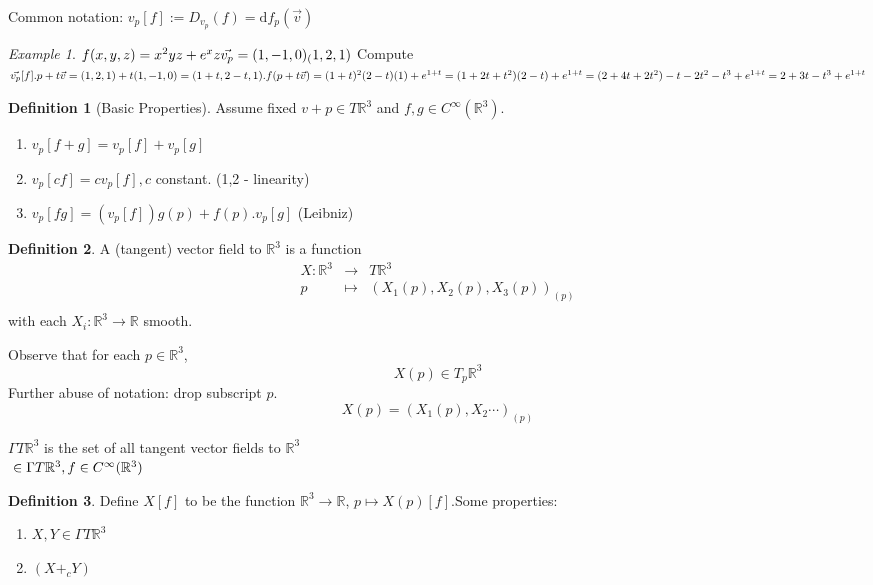 \documentclass{article}
\let\ddd\cdots
\renewcommand{\d}{\mathrm{d}}
\newcommand{\R}{\mathbb{R}}
\theoremstyle{definition}
\newtheorem{definition}{Definition}[section]
\theoremstyle{remark}
\theoremstyle{example}
\newtheorem*{example}{Example}
\begin{document}
	Common notation: $v_p[f]:=D_{v_p}(f)=\d f_p(\vec{v})$
	\begin{example}
		$f(x,y,z) = x^2yz+e^xz\\
		\vec{v_p}=(1,-1,0)_(1,2,1)\\
		$ Compute $\vec{v_p}[f].\\
		p+t\vec{v}=(1,2,1) + t(1,-1,0) = (1+t, 2-t, 1).\\
		f(p+t\vec{v}) = (1+t)^2(2-t)(1)+e^{1+t}\\
		= (1+2t+t^2)(2-t)+e^{1+t}\\
		= (2 + 4t + 2t^2) - t - 2t^2 - t^3 + e^{1+t}\\
		= 2 + 3t-t^3 + e^{1+t}$
	\end{example}

	\begin{definition}[Basic Properties]
		Assume fixed $v+p \in T \R^3$ and $f,g \in C^\infty(\R^3)$.
		\begin{enumerate}
			\item $v_p[f+g] = v_p[f] + v_p[g]$
			\item $v_p[cf] = cv_p[f], c$ constant. (1,2 - linearity)
			\item $v_p[fg]=(v_p[f])g(p) + f(p).v_p[g]$ (Leibniz)
		\end{enumerate}
	\end{definition}

	\begin{definition}
		A (tangent) vector field to $\R^3$ is a function \begin{align*}
			 X: \R^3 & \to & T \R^3\\
			  p & \mapsto & (X_1(p), X_2(p), X_3(p))_{(p)}\\
		\end{align*}
		with each $X_i:\R^3 \to \R$ smooth.
	\end{definition}

	Observe that for each $p \in \R^3$, \[ X(p) \in T_p\R^3 \]
	Further abuse of notation: drop subscript $p$.\\
	\[ X(p) = (X_1(p), X_2 \ddd )_{(p)} \]

	$\Gamma T \R^3 $ is the set of all tangent vector fields to $\R^3$\\
	$\ \in \Gamma T \R^3 , f \in C^\infty (\R^3)\\$
	\begin{definition}
	Define $X[f]$ to be the function $\R^3 \to \R$, $p \mapsto X(p)[f]$.Some properties:
	\begin{enumerate}
		\item $X,Y \in \Gamma T \R^3$
		\item $(X+_c Y)$
	\end{enumerate}
	\end{definition}
\end{document}
